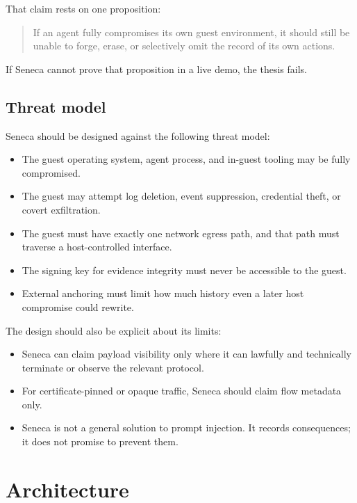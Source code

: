 \documentclass[11pt]{article}
\begin{document}
That claim rests on one proposition:

\begin{quote}
If an agent fully compromises its own guest environment, it should still be unable to forge, erase, or selectively omit the record of its own actions.
\end{quote}

If Seneca cannot prove that proposition in a live demo, the thesis fails.

\subsection{Threat model}

Seneca should be designed against the following threat model:

\begin{itemize}[leftmargin=1.5em]
    \item The guest operating system, agent process, and in-guest tooling may be fully compromised.
    \item The guest may attempt log deletion, event suppression, credential theft, or covert exfiltration.
    \item The guest must have exactly one network egress path, and that path must traverse a host-controlled interface.
    \item The signing key for evidence integrity must never be accessible to the guest.
    \item External anchoring must limit how much history even a later host compromise could rewrite.
\end{itemize}

The design should also be explicit about its limits:
\begin{itemize}[leftmargin=1.5em]
    \item Seneca can claim payload visibility only where it can lawfully and technically terminate or observe the relevant protocol.
    \item For certificate-pinned or opaque traffic, Seneca should claim flow metadata only.
    \item Seneca is not a general solution to prompt injection. It records consequences; it does not promise to prevent them.
\end{itemize}

\section{Architecture}
\end{document}
